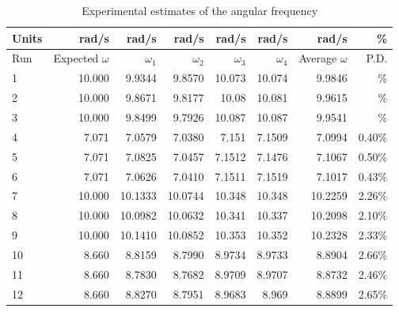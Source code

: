 \begin{table}[ht]
    \centering
    \begin{tabular}{|l|r|r|r|r|r|r|r|}
        \hline
        Units & rad/s & rad/s & rad/s & rad/s & rad/s & rad/s & \% \\
        \hline
        Run & Expected $\omega$ & $\omega_{1}$ & $\omega_{2}$ & $\omega_{3}$ & $\omega_{4}$ & Average $\omega$ & P.D. \\
        \hline
        1 & 10.000 & 9.9344 & 9.8570 & 10.073 & 10.074 & 9.9846 & \textminus 0.15\% \\
        2 & 10.000 & 9.8671 & 9.8177 & 10.08 & 10.081 & 9.9615 & \textminus 0.39\% \\
        3 & 10.000 & 9.8499 & 9.7926 & 10.087 & 10.087 & 9.9541 & \textminus 0.46\% \\
        \hline
        4 & 7.071 & 7.0579 & 7.0380 & 7.151 & 7.1509 & 7.0994 & 0.40\% \\
        5 & 7.071 & 7.0825 & 7.0457 & 7.1512 & 7.1476 & 7.1067 & 0.50\% \\
        6 & 7.071 & 7.0626 & 7.0410 & 7.1511 & 7.1519 & 7.1017 & 0.43\% \\
        \hline
        7 & 10.000 & 10.1333 & 10.0744 & 10.348 & 10.348 & 10.2259 & 2.26\% \\
        8 & 10.000 & 10.0982 & 10.0632 & 10.341 & 10.337 & 10.2098 & 2.10\% \\
        9 & 10.000 & 10.1410 & 10.0852 & 10.353 & 10.352 & 10.2328 & 2.33\% \\
        \hline
        10 & 8.660 & 8.8159 & 8.7990 & 8.9734 & 8.9733 & 8.8904 & 2.66\% \\
        11 & 8.660 & 8.7830 & 8.7682 & 8.9709 & 8.9707 & 8.8732 & 2.46\% \\
        12 & 8.660 & 8.8270 & 8.7951 & 8.9683 & 8.969 & 8.8899 & 2.65\% \\
        \hline
    \end{tabular}
    \caption{Experimental estimates of the angular frequency}
    \label{table.11.omega}
\end{table}
%
\FloatBarrier
\newpage
